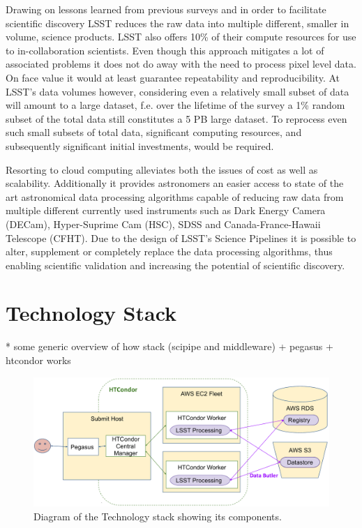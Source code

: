 \documentclass[a4paper, 10pt, conference]{ieeeconf}
\begin{document}
Drawing on lessons learned from previous surveys and in order to facilitate scientific discovery LSST reduces the raw data into multiple different, smaller in volume, science products. LSST also offers 10\% of their compute resources for use to in-collaboration scientists. Even though this approach mitigates a lot of associated problems it does not do away with the need to process pixel level data. On face value it would at least guarantee repeatability and reproducibility. At LSST's data volumes however, considering even a relatively small subset of data will amount to a large dataset, f.e. over the lifetime of the survey a 1\% random subset of the total data still constitutes a 5 PB large dataset. To reprocess even such small subsets of total data, significant computing resources, and subsequently significant initial investments, would be required.

Resorting to cloud computing alleviates both the issues of cost as well as scalability. Additionally it provides astronomers an easier access to state of the art astronomical data processing algorithms capable of reducing raw data from multiple different currently used instruments such as Dark Energy Camera (DECam), Hyper-Suprime Cam (HSC), SDSS and Canada-France-Hawaii Telescope (CFHT). Due to the design of LSST's Science Pipelines it is possible to alter, supplement or completely replace the data processing algorithms, thus enabling scientific validation and increasing the potential of scientific discovery.  


\section{Technology Stack}

* some generic overview of how stack (scipipe and middleware) + pegasus + htcondor works

\begin{figure}[htb]
\centering
\includegraphics[width=\columnwidth]{figures/workflow.png}
\caption{Diagram of the Technology stack showing its components.}
\label{fig:techstack}
\end{figure}
\end{document}
